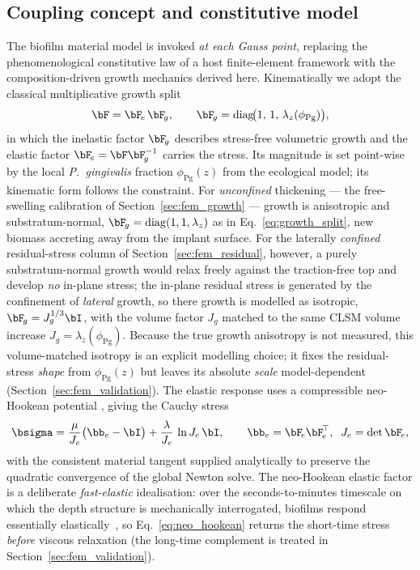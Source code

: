 \subsection{Coupling concept and constitutive model}
\label{sec:fem_method}

The biofilm material model is invoked \emph{at each Gauss point}, replacing the
phenomenological constitutive law of a host finite-element framework with the
composition-driven growth mechanics derived here. Kinematically we adopt the
classical multiplicative growth split~\cite{Rodriguez1994Growth}
\begin{equation}
  \bF = \bF_{\!e}\,\bF_{\!g},
  \qquad
  \bF_{\!g} = \operatorname{diag}\!\bigl(1,\,1,\,\lambda_z(\phi_\mathrm{Pg})\bigr),
  \label{eq:growth_split}
\end{equation}
in which the inelastic factor $\bF_{\!g}$ describes stress-free volumetric growth and
the elastic factor $\bF_{\!e}=\bF\bF_{\!g}^{-1}$ carries the stress. Its magnitude is
set point-wise by the local \textit{P.~gingivalis} fraction $\phi_\mathrm{Pg}(z)$ from
the ecological model; its kinematic form follows the constraint. For \emph{unconfined}
thickening --- the free-swelling calibration of Section~\ref{sec:fem_growth} --- growth
is anisotropic and substratum-normal, $\bF_{\!g}=\operatorname{diag}(1,1,\lambda_z)$ as
in Eq.~\eqref{eq:growth_split}, new biomass accreting away from the implant surface. For
the laterally \emph{confined} residual-stress column of Section~\ref{sec:fem_residual},
however, a purely substratum-normal growth would relax freely against the traction-free
top and develop \emph{no} in-plane stress; the in-plane residual stress is generated by
the confinement of \emph{lateral} growth, so there growth is modelled as isotropic,
$\bF_{\!g}=J_g^{1/3}\bI$, with the volume factor $J_g$ matched to the same CLSM volume
increase $J_g=\lambda_z(\phi_\mathrm{Pg})$. Because the true growth anisotropy is not
measured, this volume-matched isotropy is an explicit modelling choice; it fixes the
residual-stress \emph{shape} from $\phi_\mathrm{Pg}(z)$ but leaves its absolute
\emph{scale} model-dependent (Section~\ref{sec:fem_validation}). The elastic response
uses a compressible neo-Hookean potential
\cite{Holzapfel2000}, giving the Cauchy stress
\begin{equation}
  \bsigma
  = \frac{\mu}{J_e}\bigl(\bb_e-\bI\bigr)
  + \frac{\lambda}{J_e}\,\ln J_e\,\bI,
  \qquad
  \bb_e=\bF_{\!e}\bF_{\!e}^{\!\top},\;\;J_e=\det\bF_{\!e},
  \label{eq:neo_hookean}
\end{equation}
with the consistent material tangent supplied analytically to preserve the quadratic
convergence of the global Newton solve. The neo-Hookean elastic factor is a
deliberate \emph{fast-elastic} idealisation: over the seconds-to-minutes timescale on
which the depth structure is mechanically interrogated, biofilms respond essentially
elastically~\cite{Stoodley2002Material}, so Eq.~\eqref{eq:neo_hookean} returns the
short-time stress \emph{before} viscous relaxation (the long-time complement is
treated in Section~\ref{sec:fem_validation}).

